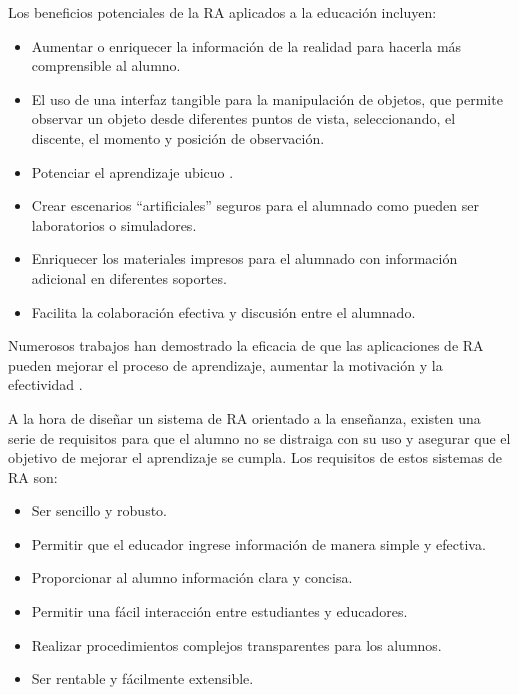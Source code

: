 Los beneficios potenciales de la RA aplicados a la educación incluyen:
\begin{itemize}

    \item Aumentar o enriquecer la información de la realidad para hacerla más comprensible al alumno.
    

    \item El uso de una interfaz tangible para la manipulación de objetos, que permite observar un objeto desde diferentes puntos de vista,
    seleccionando, el discente, el momento y posición de observación.

    \item Potenciar el aprendizaje ubicuo \cite{URL::AprendizajeUbicuo}.
    
    \item Crear escenarios ``artificiales'' seguros para el alumnado
    como pueden ser laboratorios o simuladores. 

    \item Enriquecer los materiales impresos para el alumnado con información adicional en diferentes soportes.
    
    \item Facilita la colaboración efectiva y discusión entre el alumnado.
    
\end{itemize}

Numerosos trabajos han demostrado la eficacia de que las aplicaciones de RA pueden mejorar el proceso de aprendizaje, aumentar la motivación y la efectividad \cite{URL::animationeco} \cite{URL::ar2}. 

A la hora de diseñar un sistema de RA orientado a la enseñanza, existen una serie de requisitos para que el alumno no se distraiga con su uso y asegurar que el objetivo de mejorar el aprendizaje se cumpla. Los requisitos de estos sistemas de RA son:

\begin{itemize}
    \item Ser sencillo y robusto.
    \item Permitir que el educador ingrese información de manera simple y efectiva.
    \item Proporcionar al alumno información clara y concisa.
    \item Permitir una fácil interacción entre estudiantes y educadores.
    \item Realizar procedimientos complejos transparentes para los alumnos.
    \item Ser rentable y fácilmente extensible.
\end{itemize}

